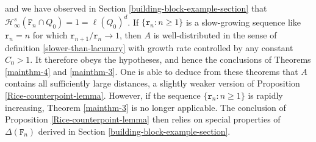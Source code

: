 \documentclass[a4paper,11pt]{amsart}
\numberwithin{equation}{section}
\begin{document}
and we have observed in Section \ref{building-block-example-section} that $\mathcal H_{\infty}^s(\mathtt F_n \cap Q_0) = 1 = \ell(Q_0)^d$.    
If $\{\mathtt r_n: n \geq 1\}$ is a slow-growing sequence like $\mathtt r_n = n$ for which $\mathtt r_{n+1}/\mathtt r_n \rightarrow 1$, then $A$ is well-distributed in the sense of definition \eqref{slower-than-lacunary} with growth rate controlled by any constant $C_0 > 1$. It therefore obeys the hypotheses, and hence the conclusions of Theorems \ref{mainthm-4} and \ref{mainthm-3}. One is able to deduce from these theorems that $A$ contains all sufficiently large distances, a slightly weaker version of Proposition \ref{Rice-counterpoint-lemma}. However, if the sequence $\{\mathtt r_n: n \geq 1\}$ is rapidly increasing, Theorem \ref{mainthm-3} is no longer applicable. The conclusion of Proposition \ref{Rice-counterpoint-lemma} then relies on special properties of $\Delta(\mathtt F_n)$ derived in Section \ref{building-block-example-section}. 
\end{document}

